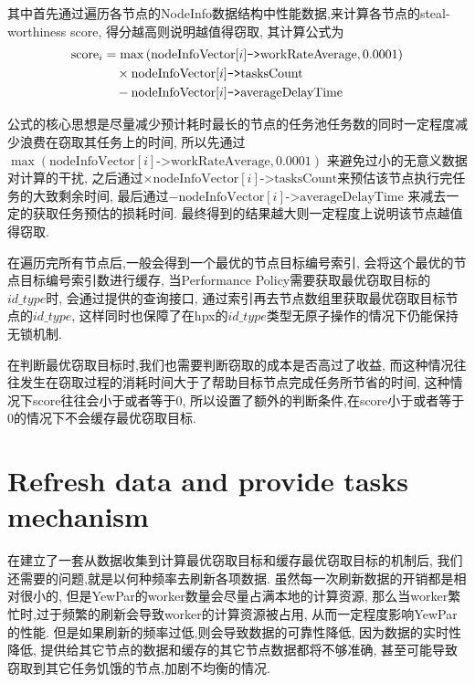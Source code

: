 \documentclass{mproj}
\begin{document}
其中首先通过遍历各节点的NodeInfo数据结构中性能数据,来计算各节点的steal-worthiness score,
得分越高则说明越值得窃取,
其计算公式为
\begin{align}
    \text{score}_i & = \max\left(\text{nodeInfoVector}[i]\texttt{->}\text{workRateAverage}, 0.0001 \right) \notag \\
                   & \quad\times \text{nodeInfoVector}[i]\texttt{->}\text{tasksCount} \notag                      \\
                   & \quad - \text{nodeInfoVector}[i]\texttt{->}\text{averageDelayTime} \label{eq:score}
\end{align}

公式的核心思想是尽量减少预计耗时最长的节点的任务池任务数的同时一定程度减少浪费在窃取其任务上的时间,
所以先通过$\max\left(\text{nodeInfoVector}[i]\texttt{->}\text{workRateAverage}, 0.0001 \right)$
来避免过小的无意义数据对计算的干扰,
之后通过$\times \text{nodeInfoVector}[i]\texttt{->}\text{tasksCount}$来预估该节点执行完任务的大致剩余时间,
最后通过$- \text{nodeInfoVector}[i]\texttt{->}\text{averageDelayTime}$
来减去一定的获取任务预估的损耗时间.
最终得到的结果越大则一定程度上说明该节点越值得窃取.

在遍历完所有节点后,一般会得到一个最优的节点目标编号索引,
会将这个最优的节点目标编号索引数进行缓存,
当Performance Policy需要获取最优窃取目标的$id\_type$时,
会通过提供的查询接口,
通过索引再去节点数组里获取最优窃取目标节点的$id\_type$,
这样同时也保障了在hpx的$id\_type$类型无原子操作的情况下仍能保持无锁机制.

在判断最优窃取目标时,我们也需要判断窃取的成本是否高过了收益,
而这种情况往往发生在窃取过程的消耗时间大于了帮助目标节点完成任务所节省的时间,
这种情况下score往往会小于或者等于0,
所以设置了额外的判断条件,在score小于或者等于0的情况下不会缓存最优窃取目标.


\section{Refresh data and provide tasks mechanism}

在建立了一套从数据收集到计算最优窃取目标和缓存最优窃取目标的机制后,
我们还需要的问题,就是以何种频率去刷新各项数据.
虽然每一次刷新数据的开销都是相对很小的,
但是YewPar的worker数量会尽量占满本地的计算资源,
那么当worker繁忙时,过于频繁的刷新会导致worker的计算资源被占用,
从而一定程度影响YewPar的性能.
但是如果刷新的频率过低,则会导致数据的可靠性降低,
因为数据的实时性降低,
提供给其它节点的数据和缓存的其它节点数据都将不够准确,
甚至可能导致窃取到其它任务饥饿的节点,加剧不均衡的情况.
\end{document}
